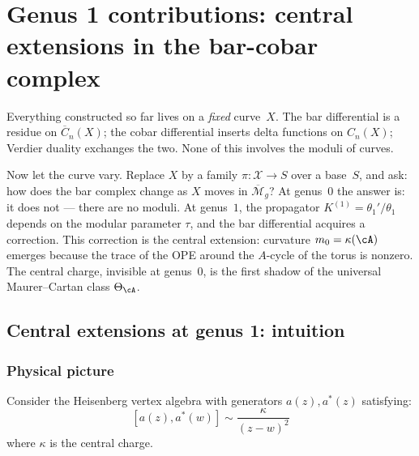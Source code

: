 \section{Genus 1 contributions: central extensions in the bar-cobar complex}
\label{sec:genus_1_central_extensions}

Everything constructed so far lives on a \emph{fixed} curve~$X$.
The bar differential is a residue on $\overline{C}_n(X)$; the
cobar differential inserts delta functions on $C_n(X)$; Verdier
duality exchanges the two.  None of this involves the moduli of
curves.

Now let the curve vary.  Replace $X$ by a family
$\pi \colon \mathcal{X} \to S$ over a base~$S$, and ask: how does
the bar complex change as $X$ moves in $\overline{\mathcal{M}}_g$?
At genus~$0$ the answer is: it does not --- there are no moduli.
At genus~$1$, the propagator $K^{(1)} = \theta_1'/\theta_1$
depends on the modular parameter $\tau$, and the bar differential
acquires a correction.  This correction is the central extension:
curvature $m_0 = \kappa(\cA)$ emerges because the trace of the
OPE around the $A$-cycle of the torus is nonzero.  The central
charge, invisible at genus~$0$, is the first shadow of the
universal Maurer--Cartan class $\Theta_{\cA}$.

\subsection{Central extensions at genus 1: intuition}

\subsubsection{Physical picture}

Consider the Heisenberg vertex algebra with generators $a(z), a^*(z)$ satisfying:
\[[a(z), a^*(w)] \sim \frac{\kappa}{(z-w)^2}\]
where $\kappa$ is the central charge.

\begin{center}
\quad\quad
{}
\end{center}

